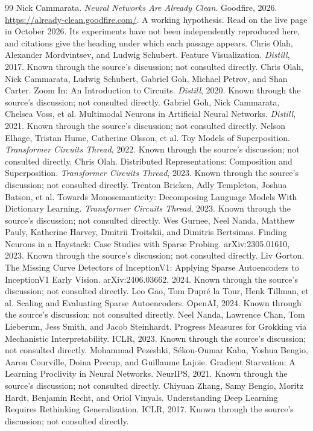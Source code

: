 \documentclass[11pt]{article}
\begin{document}
\begin{thebibliography}{99}
 Nick Cammarata. \emph{Neural Networks Are Already Clean}. Goodfire, 2026. \url{https://already-clean.goodfire.com/}. A working hypothesis. Read on the live page in October 2026. Its experiments have not been independently reproduced here, and citations give the heading under which each passage appears.
 Chris Olah, Alexander Mordvintsev, and Ludwig Schubert. Feature Visualization. \emph{Distill}, 2017. Known through the source's discussion; not consulted directly.
 Chris Olah, Nick Cammarata, Ludwig Schubert, Gabriel Goh, Michael Petrov, and Shan Carter. Zoom In: An Introduction to Circuits. \emph{Distill}, 2020. Known through the source's discussion; not consulted directly.
 Gabriel Goh, Nick Cammarata, Chelsea Voss, et al. Multimodal Neurons in Artificial Neural Networks. \emph{Distill}, 2021. Known through the source's discussion; not consulted directly.
 Nelson Elhage, Tristan Hume, Catherine Olsson, et al. Toy Models of Superposition. \emph{Transformer Circuits Thread}, 2022. Known through the source's discussion; not consulted directly.
 Chris Olah. Distributed Representations: Composition and Superposition. \emph{Transformer Circuits Thread}, 2023. Known through the source's discussion; not consulted directly.
 Trenton Bricken, Adly Templeton, Joshua Batson, et al. Towards Monosemanticity: Decomposing Language Models With Dictionary Learning. \emph{Transformer Circuits Thread}, 2023. Known through the source's discussion; not consulted directly.
 Wes Gurnee, Neel Nanda, Matthew Pauly, Katherine Harvey, Dmitrii Troitskii, and Dimitris Bertsimas. Finding Neurons in a Haystack: Case Studies with Sparse Probing. arXiv:2305.01610, 2023. Known through the source's discussion; not consulted directly.
 Liv Gorton. The Missing Curve Detectors of InceptionV1: Applying Sparse Autoencoders to InceptionV1 Early Vision. arXiv:2406.03662, 2024. Known through the source's discussion; not consulted directly.
 Leo Gao, Tom Dupr\'e la Tour, Henk Tillman, et al. Scaling and Evaluating Sparse Autoencoders. OpenAI, 2024. Known through the source's discussion; not consulted directly.
 Neel Nanda, Lawrence Chan, Tom Lieberum, Jess Smith, and Jacob Steinhardt. Progress Measures for Grokking via Mechanistic Interpretability. ICLR, 2023. Known through the source's discussion; not consulted directly.
 Mohammad Pezeshki, S\'ekou-Oumar Kaba, Yoshua Bengio, Aaron Courville, Doina Precup, and Guillaume Lajoie. Gradient Starvation: A Learning Proclivity in Neural Networks. NeurIPS, 2021. Known through the source's discussion; not consulted directly.
 Chiyuan Zhang, Samy Bengio, Moritz Hardt, Benjamin Recht, and Oriol Vinyals. Understanding Deep Learning Requires Rethinking Generalization. ICLR, 2017. Known through the source's discussion; not consulted directly.
\end{thebibliography}
\end{document}
